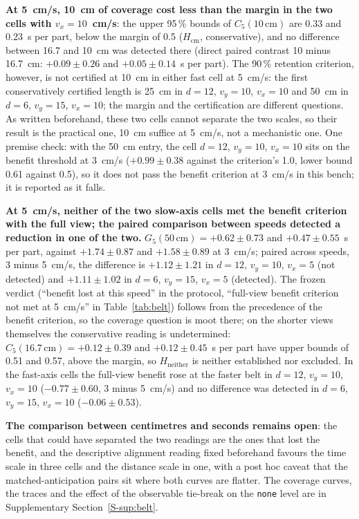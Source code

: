 \documentclass[11pt,a4paper]{article}
\newcommand{\supsec}[1]{Supplementary Section~\ref{S-#1}}
\begin{document}
\textbf{At 5~cm/s, 10~cm of coverage cost less than the margin in the two cells with
$v_x=10$~cm/s}: the upper 95\,\% bounds of $C_5(10\,\mathrm{cm})$ are 0.33 and 0.23~s per
part, below the margin of 0.5 ($H_{\mathrm{cm}}$, conservative), and no difference
between 16.7 and 10~cm was detected there (direct paired contrast 10 minus 16.7~cm:
$+0.09\pm0.26$ and $+0.05\pm0.14$~s per part). The 90\,\% retention criterion, however,
is not certified at 10~cm in either fast cell at 5~cm/s: the first conservatively
certified length is 25~cm in $d=12$, $v_y=10$, $v_x=10$ and 50~cm in $d=6$, $v_y=15$,
$v_x=10$; the margin and the certification are different questions. As written
beforehand, these two cells cannot separate the two scales, so their result is the
practical one, 10~cm suffice at 5~cm/s, not a mechanistic one. One premise check: with the
50~cm entry, the cell $d=12$, $v_y=10$, $v_x=10$ sits on the benefit threshold at 3~cm/s
($+0.99\pm0.38$ against the criterion's 1.0, lower bound 0.61 against 0.5), so it does not
pass the benefit criterion at 3~cm/s in this bench; it is reported as it falls.

\textbf{At 5~cm/s, neither of the two slow-axis cells met the benefit criterion with
the full view; the paired comparison between speeds detected a reduction in one of the
two.} $G_5(50\,\mathrm{cm})=+0.62\pm0.73$ and $+0.47\pm0.55$~s per part, against
$+1.74\pm0.87$ and $+1.58\pm0.89$ at 3~cm/s; paired across speeds, 3 minus 5~cm/s, the
difference is $+1.12\pm1.21$ in $d=12$, $v_y=10$, $v_x=5$ (not detected) and
$+1.11\pm1.02$ in $d=6$, $v_y=15$, $v_x=5$ (detected). The frozen verdict (``benefit lost at
this speed'' in the protocol, ``full-view benefit criterion not met at 5~cm/s'' in
Table~\ref{tab:belt}) follows from the precedence of the benefit criterion, so the coverage
question is moot there; on the shorter views themselves the conservative reading is
undetermined: $C_5(16.7\,\mathrm{cm})=+0.12\pm0.39$ and $+0.12\pm0.45$~s per part have upper
bounds of 0.51 and 0.57, above the margin, so $H_{\mathrm{neither}}$ is neither established
nor excluded. In the fast-axis cells the full-view benefit rose at the faster belt in
$d=12$, $v_y=10$, $v_x=10$ ($-0.77\pm0.60$, 3 minus 5~cm/s) and no difference was detected
in $d=6$, $v_y=15$, $v_x=10$ ($-0.06\pm0.53$).

\textbf{The comparison between centimetres and seconds remains open}: the cells that
could have separated the two readings are the ones that lost the benefit, and the
descriptive alignment reading fixed beforehand favours the time scale in three cells and
the distance scale in one, with a post hoc caveat that the matched-anticipation pairs sit
where both curves are flatter. The coverage curves, the traces and the effect of the
observable tie-break on the \texttt{none} level are in \supsec{sup:belt}.
\end{document}
